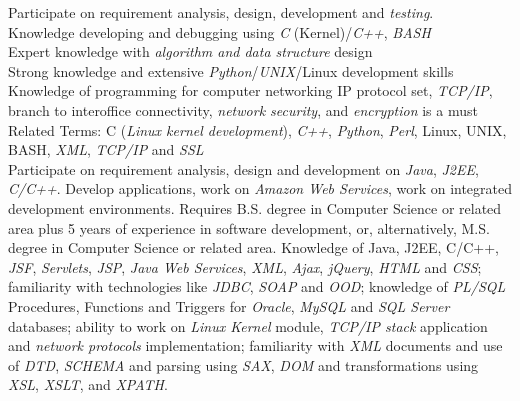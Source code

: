 \begin{framed}\noindent
Participate on requirement analysis, design, development and \emph{testing}.\\
Knowledge developing and debugging using \emph{C} (Kernel)/\emph{C++},
\emph{BASH}\\
Expert knowledge with \emph{algorithm and data structure} design \\
Strong knowledge and extensive \emph{Python}/\emph{UNIX}/Linux development skills \\
Knowledge of programming for computer networking IP protocol set, \emph{TCP/IP}, branch to interoffice connectivity, \emph{network security}, and \emph{encryption} is a must \\
Related Terms: C (\emph{Linux kernel development}), \emph{C++}, \emph{Python},
\emph{Perl}, Linux, UNIX, BASH, \emph{XML}, \emph{TCP/IP} and \emph{SSL}\\
Participate on requirement analysis, design and development on \emph{Java}, \emph{J2EE}, \emph{C/C++}. Develop applications, work on \emph{Amazon Web Services}, work on integrated development environments. Requires B.S. degree in Computer Science or related area plus 5 years of experience in software development, or, alternatively, M.S. degree in Computer Science or related area. Knowledge of Java, J2EE, C/C++, \emph{JSF}, \emph{Servlets}, \emph{JSP}, \emph{Java Web Services}, \emph{XML}, \emph{Ajax}, \emph{jQuery}, \emph{HTML} and \emph{CSS}; familiarity with technologies like \emph{JDBC}, \emph{SOAP} and \emph{OOD}; knowledge of \emph{PL/SQL} Procedures, Functions and Triggers for \emph{Oracle}, \emph{MySQL} and \emph{SQL Server} databases; ability to work on \emph{Linux Kernel} module, \emph{TCP/IP stack} application and \emph{network protocols} implementation; familiarity with \emph{XML} documents and use of \emph{DTD}, \emph{SCHEMA} and parsing using \emph{SAX}, \emph{DOM} and transformations using \emph{XSL}, \emph{XSLT}, and \emph{XPATH}.
\end{framed}

